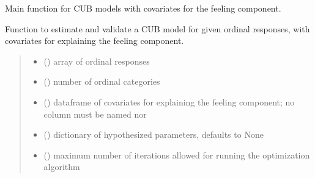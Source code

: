 \documentclass[letterpaper,10pt,english]{sphinxmanual}
\begin{document}

\begin{fulllineitems}
\label{\detokenize{cubmods:cubmods.cub_0w.mle}}
\pysigstartsignatures
{}
\pysigstopsignatures
\sphinxAtStartPar
Main function for CUB models with covariates for the feeling component.

\sphinxAtStartPar
Function to estimate and validate a CUB model for given ordinal responses, with covariates for
explaining the feeling component.
\begin{quote}\begin{description}
\begin{itemize}
\item {} 
\sphinxAtStartPar
{} () \textendash{} array of ordinal responses

\item {} 
\sphinxAtStartPar
{} () \textendash{} number of ordinal categories

\item {} 
\sphinxAtStartPar
{} () \textendash{} dataframe of covariates for explaining the feeling component;
no column must be named  nor 

\item {} 
\sphinxAtStartPar
{} (\sphinxstyleliteralemphasis{\sphinxupquote{, }}) \textendash{} dictionary of hypothesized parameters, defaults to None

\item {} 
\sphinxAtStartPar
{} () \textendash{} maximum number of iterations allowed for running the optimization algorithm


\end{itemize}
\end{description}
\end{quote}
\end{fulllineitems}
\end{document}
